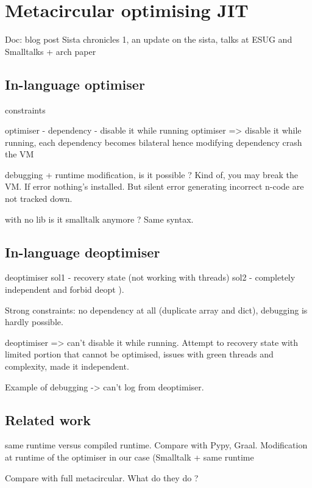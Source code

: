 \documentclass[a4paper,12pt,twoside]{../includes/ThesisStyle}
\begin{document}
\fi

\chapter{Metacircular optimising JIT}
\label{chap:metacircular}
\minitoc

Doc: blog post Sista chronicles 1, an update on the sista, talks at ESUG and Smalltalks + arch paper

\section{In-language optimiser}

constraints 

optimiser
- dependency
- disable it while running
optimiser => disable it while running, each dependency becomes bilateral hence modifying dependency crash the VM

debugging + runtime modification, is it possible ? Kind of, you may break the VM. If error nothing's installed. But silent error generating incorrect n-code are not tracked down.

with no lib is it smalltalk anymore ? Same syntax.

\section{In-language deoptimiser}

deoptimiser
sol1
- recovery state (not working with threads)
sol2
- completely independent and forbid deopt
).

Strong constraints: no dependency at all (duplicate array and dict), debugging is hardly possible.

deoptimiser => can't disable it while running. Attempt to recovery state with limited portion that cannot be optimised, issues with green threads and complexity, made it independent.

Example of debugging -> can't log from deoptimiser. 

\section{Related work}

same runtime versus compiled runtime. Compare with Pypy, Graal. Modification at runtime of the optimiser in our case (Smalltalk + same runtime

Compare with full metacircular. What do they do ?



\ifx\wholebook\relax\else
    
\end{document}
